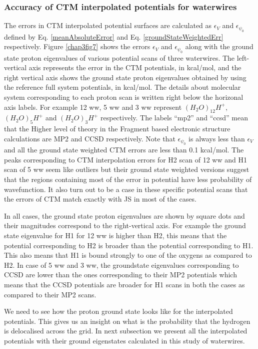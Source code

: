\subsubsection{Accuracy of CTM interpolated potentials for waterwires}
The errors in CTM interpolated potential surfaces are calculated as $\epsilon_{V}$ and $\epsilon_{\psi_{0}}$
defined by Eq. \ref{meanAbsoluteError} and Eq. \ref{groundStateWeightedErr} respectively. Figure \ref{chap3fig7}
shows the errors $\epsilon_{V}$ and $\epsilon_{\psi_{0}}$ along with the ground state
proton eigenvalues of various potential scans of three waterwires. The left-vertical axis represents the error in
the CTM potentials, in kcal/mol, and the right vertical axis shows the ground state proton eigenvalues obtained
by using the reference full system potentials, in kcal/mol. The details about molecular system corresponding to
each proton scan is written right below the horizonal axis labels. For example 12 ww, 5 ww and 3 ww represent
$(H_{2}O)_{12}H^+$, $(H_{2}O)_{5}H^+$ and $(H_{2}O)_{3}H^+$ respectively. The labels ``mp2'' and ``ccsd'' mean
that the Higher level of theory in the Fragment based electronic structure calculations are MP2 and CCSD
respectively. Note that $\epsilon_{\psi_{0}}$ is always less than $\epsilon_{V}$ and all the ground state
weighted CTM errors are less than 0.1 kcal/mol. The peaks corresponding to CTM interpolation errors for H2 scan
of 12 ww and H1 scan of 5 ww seem like outliers but their ground state weighted versions suggest that the regions
containing most of the error in potential have less probability of wavefunction. It also turn out to be a case
in these specific potential scans that the errors of CTM match exactly with JS in most of the cases.

In all cases, the ground state proton eigenvalues are shown by square dots and their magnitudes correspond
to the right-vertical axis. For example the ground state eigenvalue for H1 for 12 ww is higher than H2, this
means that the potential corresponding to H2 is broader than the potential corresponding to H1. This also
means that H1 is bound strongly to one of the oxygens as compared to H2. In case of 5 ww and 3 ww, the
groundstate eigenvalues corresponding to CCSD are lower than the ones corresponding to their MP2 potentials
which means that the CCSD potentials are broader for H1 scans in both the cases as compared to their MP2 scans.

We need to see how the proton ground state looks like for the interpolated potentials. This gives us an insight
on what is the probability that the hydrogen is delocalised across the grid. In next subsection we present
all the interpolated potentials with their ground eigenstates calculated in this study of waterwires.

